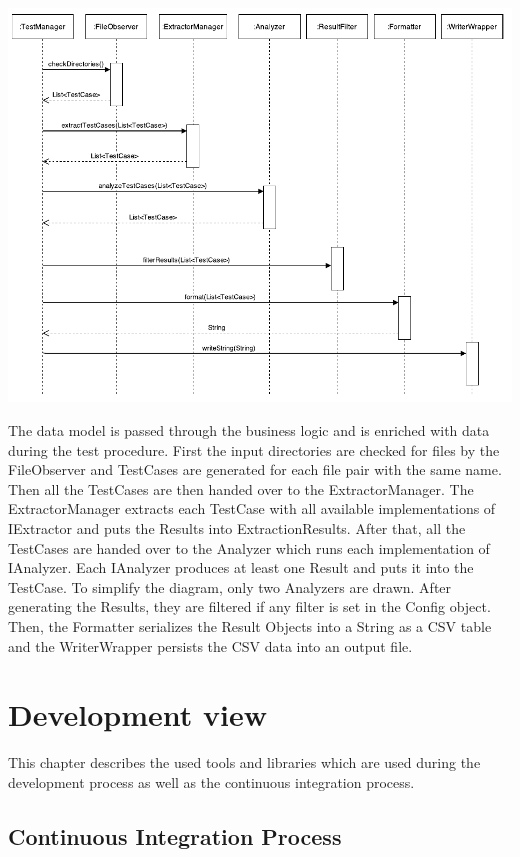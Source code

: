 \includegraphics[width=15cm]{Figures/activityDiagram.pdf}

The data model is passed through the business logic and is enriched with data during the test procedure. First the input directories are checked for files by the FileObserver and TestCases are generated for each file pair with the same name. Then all the TestCases are then handed over to the ExtractorManager. The ExtractorManager extracts each TestCase with all available implementations of IExtractor and puts the Results into ExtractionResults. After that, all the TestCases are handed over to the Analyzer which runs each implementation of IAnalyzer. Each IAnalyzer produces at least one Result and puts it into the TestCase. To simplify the diagram, only two Analyzers are drawn. After generating the Results, they are filtered if any filter is set in the Config object. Then, the Formatter serializes the Result Objects into a String as a CSV table and the WriterWrapper persists the CSV data into an output file.


\section{Development view}
\label{architecture:developmentView}

This chapter describes the used tools and libraries which are used during the development process as well as the continuous integration process.


\subsection{Continuous Integration Process}

